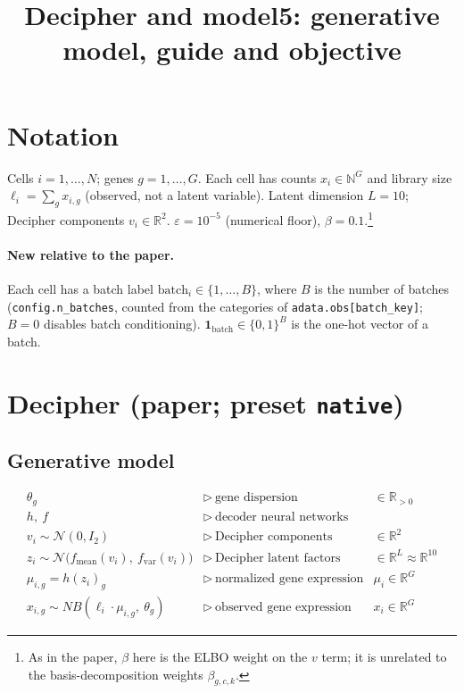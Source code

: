 \documentclass{article}
\title{Decipher and model5: generative model, guide and objective}
\date{}
\newcommand{\batch}{\mathrm{batch}}
\newcommand{\one}{\mathbf{1}}
\begin{document}
\maketitle

\section{Notation}

Cells $i = 1,\dots,N$; genes $g = 1,\dots,G$. Each cell has counts $x_i \in \mathbb{N}^G$ and
library size $\ell_i = \sum_g x_{i,g}$ (observed, not a latent variable). Latent dimension
$L = 10$; Decipher components $v_i \in \mathbb{R}^2$. $\varepsilon = 10^{-5}$ (numerical
floor), $\beta = 0.1$.\footnote{As in the paper, $\beta$ here is the ELBO weight on the $v$
term; it is unrelated to the basis-decomposition weights $\beta_{g,c,k}$.}

\paragraph{New relative to the paper.} Each cell has a batch label
$\batch_i \in \{1,\dots,B\}$, where $B$ is the number of batches (\texttt{config.n\_batches},
counted from the categories of \texttt{adata.obs[batch\_key]}; $B = 0$ disables batch
conditioning). $\one_{\batch} \in \{0,1\}^B$ is the one-hot vector of a batch.

\section{Decipher (paper; preset \texttt{native})}

\subsection{Generative model}
\[
\begin{array}{lll}
\theta_g & \triangleright\ \text{gene dispersion} & \in \mathbb{R}_{>0} \\
h,\ f & \triangleright\ \text{decoder neural networks} & \\
\hline
v_i \sim \mathcal{N}(0, I_2) & \triangleright\ \text{Decipher components} & \in \mathbb{R}^2 \\
z_i \sim \mathcal{N}\big(f_{\mathrm{mean}}(v_i),\ f_{\mathrm{var}}(v_i)\big)
  & \triangleright\ \text{Decipher latent factors} & \in \mathbb{R}^L \approx \mathbb{R}^{10} \\
\mu_{i,g} = h(z_i)_g & \triangleright\ \text{normalized gene expression} & \mu_i \in \mathbb{R}^G \\
x_{i,g} \sim NB(\ell_i \cdot \mu_{i,g},\ \theta_g) & \triangleright\ \text{observed gene expression} & x_i \in \mathbb{R}^G
\end{array}
\]
\end{document}
